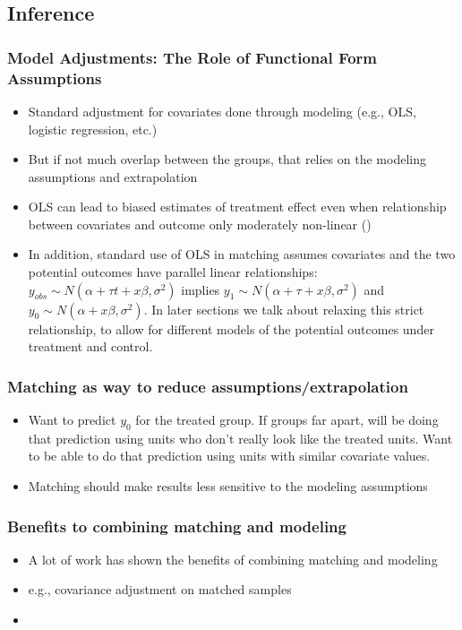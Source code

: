 \documentclass[11pt,titlepage]{article}
\begin{document}
\subsection{Inference}
\subsubsection{Model Adjustments: The Role of Functional Form Assumptions}
\begin{itemize}
\item Standard adjustment for covariates done through modeling (e.g., OLS, logistic regression, etc.)
\item But if not much overlap between the groups, that relies on the modeling assumptions and extrapolation
\item OLS can lead to biased estimates of treatment effect even when relationship between covariates and outcome only moderately non-linear
(\cite{Rubin73a, Rubin73b})
\item In addition, standard use of OLS in matching assumes covariates and the two potential outcomes have parallel linear relationships:
$y_{obs} \sim N(\alpha + \tau t + x \beta, \sigma^2)$ implies $y_1 \sim N(\alpha + \tau + x \beta, \sigma^2)$ and 
$y_0 \sim N(\alpha + x \beta, \sigma^2)$.  In later sections we talk about relaxing this strict relationship, to allow for different
models of the potential outcomes under treatment and control.  
\end{itemize}


\subsubsection{Matching as way to reduce assumptions/extrapolation}
\begin{itemize}
\item Want to predict $y_0$ for the treated group.  If groups far apart, will be doing that prediction using units who don't really look like the treated units. Want to be
able to do that prediction using units with similar covariate values.
\item Matching should make results less sensitive to the modeling assumptions
\end{itemize}

\subsubsection{Benefits to combining matching and modeling}
\begin{itemize}
\item A lot of work has shown the benefits of combining matching and modeling
\item e.g., covariance adjustment on matched samples
\item \cite{Rubin73b, RobRot95, AbaImb04}
\end{itemize}
                                                                                                                                                
\end{document}
